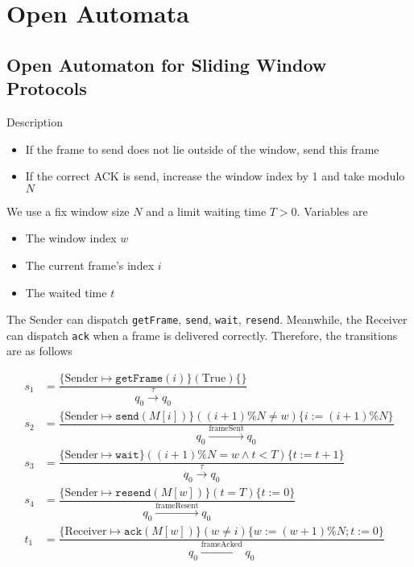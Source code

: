 \chapter{Open Automata}
\section{Open Automaton for Sliding Window Protocols}

Description

\begin{itemize}
  \item If the frame to send does not lie outside of the window, send this frame
  \item If the correct ACK is send, increase the window index by 1 and take modulo $N$
\end{itemize}

We use a fix window size $N$ and a limit waiting time $T > 0$. Variables are
\begin{itemize}
  \item The window index $w$
  \item The current frame's index $i$
  \item The waited time $t$
\end{itemize}

The Sender can dispatch \texttt{getFrame}, \texttt{send}, \texttt{wait}, \texttt{resend}. Meanwhile, the Receiver can dispatch \texttt{ack} when a frame is delivered correctly. Therefore, the transitions are as follows

$$\begin{aligned}
    s_1 & = \dfrac{\{\text{Sender}\mapsto \texttt{getFrame}(i)\}(\text{True})\{\}}{q_0\xrightarrow{\tau}q_0}                                \\
    s_2 & = \dfrac{\{\text{Sender}\mapsto \texttt{send}(M[i])\}((i+1)\% N \neq w)\{i:= (i + 1)\%N\}}{q_0\xrightarrow{\text{frameSent}}q_0}  \\
    s_3 & = \dfrac{\{\text{Sender}\mapsto \texttt{wait}\}((i+1)\% N = w \wedge t < T)\{t:= t + 1\}}{q_0\xrightarrow{\tau}q_0}               \\
    s_4 & = \dfrac{\{\text{Sender}\mapsto \texttt{resend}(M[w])\}(t = T)\{t:= 0\}}{q_0\xrightarrow{\text{frameResent}}q_0}                  \\
    t_1 & = \dfrac{\{\text{Receiver}\mapsto \texttt{ack}(M[w])\}(w \neq i)\{w:= (w + 1)\%N; t:= 0\}}{q_0\xrightarrow{\text{frameAcked}}q_0} \\
  \end{aligned}
$$

